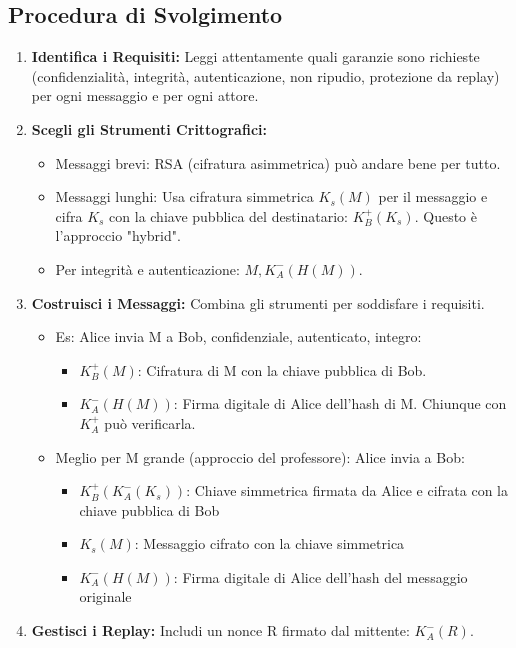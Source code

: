 \subsection{Procedura di Svolgimento}
\begin{enumerate}[label=\arabic*.]
    \item \textbf{Identifica i Requisiti:} Leggi attentamente quali garanzie sono richieste (confidenzialità, integrità, autenticazione, non ripudio, protezione da replay) per ogni messaggio e per ogni attore.
    \item \textbf{Scegli gli Strumenti Crittografici:}
    \begin{itemize}
        \item Messaggi brevi: RSA (cifratura asimmetrica) può andare bene per tutto.
        \item Messaggi lunghi: Usa cifratura simmetrica $K_s(M)$ per il messaggio e cifra $K_s$ con la chiave pubblica del destinatario: $K_B^+(K_s)$. Questo è l'approccio "hybrid".
        \item Per integrità e autenticazione: $M, K_A^-(H(M))$.
    \end{itemize}
    \item \textbf{Costruisci i Messaggi:} Combina gli strumenti per soddisfare i requisiti.
    \begin{itemize}
        \item Es: Alice invia M a Bob, confidenziale, autenticato, integro:
        \begin{itemize}
            \item $K_B^+(M)$: Cifratura di M con la chiave pubblica di Bob.
            \item $K_A^-(H(M))$: Firma digitale di Alice dell'hash di M. Chiunque con $K_A^+$ può verificarla.
        \end{itemize}
        \item Meglio per M grande (approccio del professore): Alice invia a Bob:
        \begin{itemize}
            \item $K_B^+(K_A^-(K_s))$: Chiave simmetrica firmata da Alice e cifrata con la chiave pubblica di Bob
            \item $K_s(M)$: Messaggio cifrato con la chiave simmetrica
            \item $K_A^-(H(M))$: Firma digitale di Alice dell'hash del messaggio originale
        \end{itemize}
    \end{itemize}
    \item \textbf{Gestisci i Replay:} Includi un nonce R firmato dal mittente: $K_A^-(R)$.


\end{enumerate}
